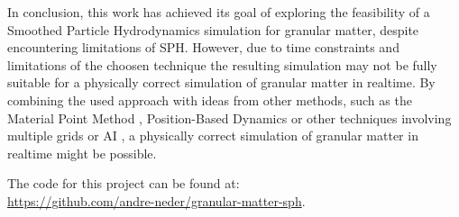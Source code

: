 \documentclass[intern]{cgMA}
\begin{document}
    In conclusion, this work has achieved its goal of exploring the feasibility of a Smoothed Particle Hydrodynamics simulation for granular matter, despite encountering limitations of SPH. However, due to time constraints and limitations of the choosen technique the resulting simulation may not be fully suitable for a physically correct simulation of granular matter in realtime. By combining the used approach with ideas from other methods, such as the Material Point Method \cite{BARDENHAGEN2000529}, Position-Based Dynamics\cite{10.2312:egt.20151045} or other techniques involving multiple grids \cite{Shao:2022:Multigrid} or AI \cite{sanchezgonzalez2020learning}, a physically correct simulation of granular matter in realtime might be possible. 

    The code for this project can be found at:\\
    \url{https://github.com/andre-neder/granular-matter-sph}.
    \pagebreak
    \listoffigures
    \pagebreak
    \printunsrtglossary[type=symbols,style=long]
    \pagebreak
    \printbibliography
\end{document}

